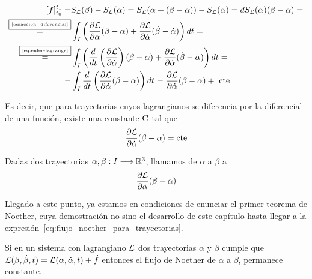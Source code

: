 \begin{equation}
	\label{eq:diferencial_trayectoria}
	\begin{split}
	[f]
		_{t_0}^{t_1} = & S_{\mathcal{L}}(\beta) - S_{\mathcal{L}}(\alpha) = S_{\mathcal{L}}(\alpha + (\beta-\alpha))-S_{\mathcal{L}}(\alpha)=dS_{\mathcal{L}}(\alpha)(\beta-\alpha)=\\
		\overset{\fbox{\tiny \ref{eq:accion_diferencial}}}{=} & \int_{I}\left( \frac{\partial \mathcal{L}}{\partial\alpha}(\beta-\alpha)+\frac{\partial \mathcal{L}}{\partial\dot{\alpha}}(\dot{\beta}-\dot{\alpha})\right) dt = \\
		\overset{\fbox{\tiny \ref{eq:euler-lagrange}}}{=} & \int_{I}\left( \frac{d}{dt}\left(\frac{\partial \mathcal{L}}{\partial\dot{\alpha}}\right)(\beta-\alpha)+\frac{\partial \mathcal{L}}{\partial\dot{\alpha}}(\dot{\beta}-\dot{\alpha})\right) dt=\\
		= & \int_{I}\frac{d}{dt}\left(\frac{\partial \mathcal{L}}{\partial\dot{\alpha}}(\beta-\alpha)\right) dt = \frac{\partial \mathcal{L}}{\partial\dot{\alpha}}(\beta-\alpha) + \text{ cte }
	\end{split}
\end{equation}

Es decir, que para trayectorias cuyos lagrangianos se diferencia por la diferencial de una función, existe una constante $\text{\rmfamily\upshape C}$ tal que
\begin{equation}
	\label{eq:flujo_noether_para_trayectorias}
	\frac{\partial \mathcal{L}}{\partial\dot{\alpha}}(\beta-\alpha) = \text{\rmfamily\upshape cte}
\end{equation}

\begin{definition}
	Dadas dos trayectorias $\alpha,\beta:I\longrightarrow \mathbb{R}^3$, llamamos  de $\alpha$ a $\beta$ a
	\begin{equation}
		\label{eq:flujo_noether}
		\frac{\partial \mathcal{L}}{\partial\dot{\alpha}}(\beta-\alpha)
	\end{equation}
\end{definition}

Llegado a este punto, ya estamos en condiciones de enunciar el primer teorema de Noether, cuya demostración no sino el desarrollo de este capítulo hasta llegar a la expresión~\ref{eq:flujo_noether_para_trayectorias}.

\begin{theorem}
	\label{thm:noether}
	Si en un sistema con lagrangiano $\mathcal{L}$ dos trayectorias $\alpha$ y $\beta$ cumple que $\mathcal{L}(\beta, \dot{\beta}, t) = \mathcal{L}(\alpha, \dot{\alpha}, t)+\dot{f}$ entonces el flujo de Noether de $\alpha$ a $\beta$, permanece constante.
\end{theorem}